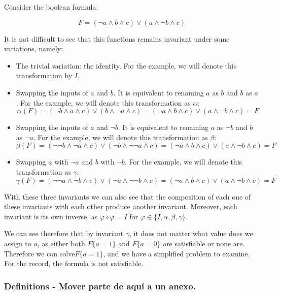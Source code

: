 \begin{example}
Consider the boolean formula:

$$ F = (\neg a \land b  \land c) \lor (a \land \neg b \land c)$$

It is not difficult to see that this functions remains invariant under some variations, namely:

\begin{itemize}
\item The trivial variation: the identity. For the example, we will denote this transformation by  $I$.

\item Swapping the inputs of $a$ and $b$. It is equivalent to renaming $a$ as $b$ and $b$ as $a$. For the example, we will denote this transformation as $\alpha$: 
  $$\alpha(F) = (\neg b \land a  \land c) \lor (b \land \neg a \land c) = (\neg a \land b  \land c) \lor (a \land \neg b \land c) = F$$
\item Swapping the inputs of $a$ and $\neg b$. It is equivalent to renaming $a$ as $\neg b$ and $b$ as $\neg a$. For the example, we will denote this transformation as $\beta$: 
  $$\beta(F) = (\neg \neg b \land \neg a  \land c) \lor (\neg b \land \neg \neg a \land c) = (\neg a \land b  \land c) \lor (a \land \neg b \land c) = F$$

\item Swapping $a$ with $\neg a$ and $b$ with $\neg b$. For the example, we will denote this transformation as $\gamma$: 
  $$\gamma(F) = (\neg \neg a \land \neg b  \land c) \lor (\neg a \land \neg \neg b \land c) = (\neg a \land b  \land c) \lor (a \land \neg b \land c) = F$$
\end{itemize}

With these three invariants we can also see that the composition of each one of these invariants with each other produce another invariant. Moreover, each invariant is its own inverse, as $\varphi \circ \varphi = I $ for $\varphi \in \{I, \alpha, \beta, \gamma\}$.

We can see therefore that by invariant $\gamma$, it does not matter what value does we assign to $a$, as either both $F\{a = 1\}$ and $F\{a=0\}$ are satisfiable or none are. Therefore we can solve$F\{a=1\}$, and we have a simplified problem to examine. For the record, the formula is not satisfiable.

\end{example}


\subsubsection{Definitions - Mover parte de aquí a un anexo.}

